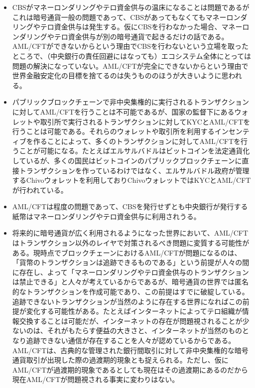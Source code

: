 \documentclass[dvipdfmx,a4paper]{jsarticle}
\begin{document}
\begin{itemize}
\item CBSがマネーロンダリングやテロ資金供与の温床になることは問題であるがこれは暗号通貨一般の問題であって、CBSがあってもなくてもマネーロンダリングやテロ資金供与は発生する。仮にCBSを行わなかった場合、マネーロンダリングやテロ資金供与が別の暗号通貨で起きるだけの話である。AML/CFTができないからという理由でCBSを行わないという立場を取ったところで、（中央銀行の責任回避にはなっても）エコシステム全体にとっては問題の解決になっていない。AML/CFTが完全にできないからという理由で世界金融安定化の目標を捨てるのは失うもののほうが大きいように思われる。
\item パブリックブロックチェーンで非中央集権的に実行されるトランザクションに対してAML/CFTを行うことは不可能であるが、国家の監督下にあるウォレットや取引所で実行されるトランザクションに対してKYCとAML/CFTを行うことは可能である。それらのウォレットや取引所を利用するインセンティブを作ることによって、多くのトランザクションに対してAML/CFTを行うことが可能になる。たとえばエルサルバドルはビットコインを法定通貨化しているが、多くの国民はビットコインのパブリックブロックチェーンに直接トランザクションを作っているわけではなく、エルサルバドル政府が管理するChivoウォレットを利用しておりChivoウォレットではKYCとAML/CFTが行われている。
\item AML/CFTは程度の問題であって、CBSを発行せずとも中央銀行が発行する紙幣はマネーロンダリングやテロ資金供与に利用されうる。
\item 将来的に暗号通貨が広く利用されるようになった世界において、AML/CFTはトランザクション以外のレイヤで対策されるべき問題に変質する可能性がある。現時点でブロックチェーンにおけるAML/CFTが問題になるのは、「貨幣のトランザクションは追跡できるものである」という前提が人々の間に存在し、よって「マネーロンダリングやテロ資金供与のトランザクションは禁止できる」と人々が考えているからであるが、暗号通貨の世界では匿名的なトランザクションを作成可能であり、この前提はすでに破綻している。追跡できないトランザクションが当然のように存在する世界になればこの前提が変化する可能性がある。たとえばインターネットによってテロ組織が情報交換することは可能だが、インターネットの存在が問題視されることが少ないのは、それがもたらす便益の大きさと、インターネットが当然のものとなり追跡できない通信が存在することを人々が認めているからである。AML/CFTは、古典的な管理された銀行間取引に対して非中央集権的な暗号通貨取引が出現した際の過渡期的現象とも捉えられる。ただし、仮にAML/CFTが過渡期的現象であるとしても現在はその過渡期にあるのだから現在AML/CFTが問題視される事実に変わりはない。
\end{itemize}
\end{document}
